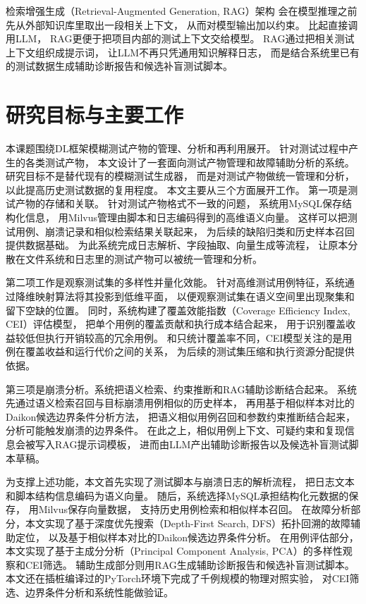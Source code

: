 检索增强生成（Retrieval-Augmented Generation, RAG）架构\cite{ref_rag}
会在模型推理之前先从外部知识库里取出一段相关上下文，
从而对模型输出加以约束。
比起直接调用LLM，
RAG更便于把项目内部的测试上下文交给模型。
RAG通过把相关测试上下文组织成提示词，
让LLM不再只凭通用知识解释日志，
而是结合系统里已有的测试数据生成辅助诊断报告和候选补盲测试脚本。

\section{研究目标与主要工作}

本课题围绕DL框架模糊测试产物的管理、分析和再利用展开。
针对测试过程中产生的各类测试产物，
本文设计了一套面向测试产物管理和故障辅助分析的系统。
研究目标不是替代现有的模糊测试生成器，
而是对测试产物做统一管理和分析，
以此提高历史测试数据的复用程度。
本文主要从三个方面展开工作。
第一项是测试产物的存储和关联。
针对测试产物格式不一致的问题，
系统用MySQL保存结构化信息，
用Milvus管理由脚本和日志编码得到的高维语义向量。
这样可以把测试用例、崩溃记录和相似检索结果关联起来，
为后续的缺陷归类和历史样本召回提供数据基础。
为此系统完成日志解析、字段抽取、向量生成等流程，
让原本分散在文件系统和日志里的测试产物可以被统一管理和分析。

第二项工作是观察测试集的多样性并量化效能。
针对高维测试用例特征，系统通过降维映射算法将其投影到低维平面，
以便观察测试集在语义空间里出现聚集和留下空缺的位置。
同时，系统构建了覆盖效能指数（Coverage Efficiency Index, CEI）评估模型，
把单个用例的覆盖贡献和执行成本结合起来，
用于识别覆盖收益较低但执行开销较高的冗余用例。
和只统计覆盖率不同，CEI模型关注的是用例在覆盖收益和运行代价之间的关系，
为后续的测试集压缩和执行资源分配提供依据。

第三项是崩溃分析。系统把语义检索、约束推断和RAG辅助诊断结合起来。
系统先通过语义检索召回与目标崩溃用例相似的历史样本，
再用基于相似样本对比的Daikon候选边界条件分析方法，
把语义相似用例召回和参数约束推断结合起来，
分析可能触发崩溃的边界条件。
在此之上，相似用例上下文、可疑约束和复现信息会被写入RAG提示词模板，
进而由LLM产出辅助诊断报告以及候选补盲测试脚本草稿。

为支撑上述功能，本文首先实现了测试脚本与崩溃日志的解析流程，
把日志文本和脚本结构信息编码为语义向量。
随后，系统选择MySQL承担结构化元数据的保存，
用Milvus保存向量数据，
支持历史用例检索和相似样本召回。
在故障分析部分，本文实现了基于深度优先搜索（Depth-First Search, DFS）拓扑回溯的故障辅助定位，
以及基于相似样本对比的Daikon候选边界条件分析。
在用例评估部分，本文实现了基于主成分分析（Principal Component Analysis, PCA）的多样性观察和CEI筛选。
辅助生成部分则用RAG生成辅助诊断报告和候选补盲测试脚本。
本文还在插桩编译过的PyTorch环境下完成了千例规模的物理对照实验，
对CEI筛选、边界条件分析和系统性能做验证。